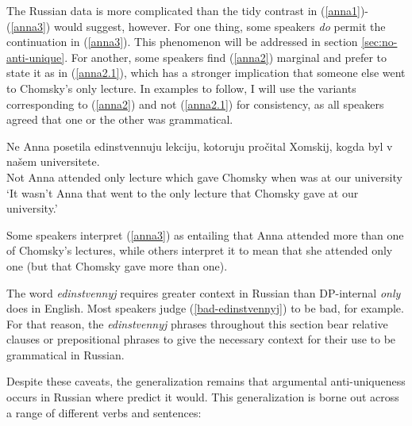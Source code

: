 The Russian data is more complicated than the tidy contrast in (\ref{anna1})-(\ref{anna3}) would suggest, however. For one thing, some speakers \textit{do} permit the continuation in (\ref{anna3}). This phenomenon will be addressed in section \ref{sec:no-anti-unique}. For another, some speakers find (\ref{anna2}) marginal and prefer to state it as in (\ref{anna2.1}), which has a stronger implication that someone else went to Chomsky's only lecture. In examples to follow, I will use the variants corresponding to (\ref{anna2}) and not (\ref{anna2.1}) for consistency, as all speakers agreed that one or the other was grammatical.

\begin{exe}
	\ex \label{anna2.1} \gll Ne Anna posetila edinstvennuju lekciju, kotoruju pro\v{c}ital Xomskij, kogda byl v na\v{s}em universitete.\\
	Not Anna attended only lecture which gave Chomsky when was at our university\\
	\glt `It wasn't Anna that went to the only lecture that Chomsky gave at our university.'
\end{exe}

Some speakers interpret (\ref{anna3}) as entailing that Anna attended more than one of Chomsky's lectures, while others interpret it to mean that she attended only one (but that Chomsky gave more than one).

The word \textit{edinstvennyj} requires greater context in Russian than DP-internal \textit{only} does in English. Most speakers judge (\ref{bad-edinstvennyj}) to be bad, for example. For that reason, the \textit{edinstvennyj} phrases throughout this section bear relative clauses or prepositional phrases to give the necessary context for their use to be grammatical in Russian.

\begin{exe}
\end{exe}

Despite these caveats, the generalization remains that argumental anti-uniqueness occurs in Russian where \citeauthor{cb2015} predict it would. This generalization is borne out across a range of different verbs and sentences:

